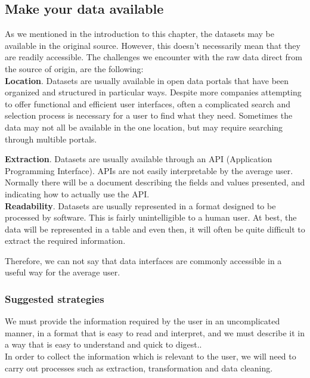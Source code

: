 \subsection{Make your data available}
    
As we mentioned in the introduction to this chapter, the datasets may be available in the original source. However, this doesn't necessarily
mean that they are readily accessible.
The challenges we encounter with the raw data direct from the source of origin, are the following: \\   
 
\textbf{Location}. Datasets are usually available in open data portals that have been organized and structured in particular ways.
Despite more companies attempting to offer functional and efficient user interfaces, often a complicated search and selection process is necessary for a user to find what they need. Sometimes the data may not all be available in the one location, but may require searching through multible portals.

\textbf{Extraction}. Datasets are usually available through an API (Application Programming Interface). APIs are not easily interpretable by the average user. Normally there will be a document describing the fields and values presented, and indicating how to actually use the API. \\

\textbf{Readability}. Datasets are usually represented in a format designed to be processed by software. This is fairly unintelligible to a human user. At best,
the data will be represented in a table and even then, it will often be quite difficult to extract the required information.

Therefore, we can not say that data interfaces are commonly accessible in a useful way for the average user. \\

\subsubsection*{Suggested strategies} 

We must provide the information required by the user in an uncomplicated manner, in a format that is easy to read and interpret, and we must describe it in a way that is easy to understand and quick to digest..\\

In order to collect the information which is relevant to the user, we will need to carry out processes such as extraction, transformation and
data cleaning.
 
